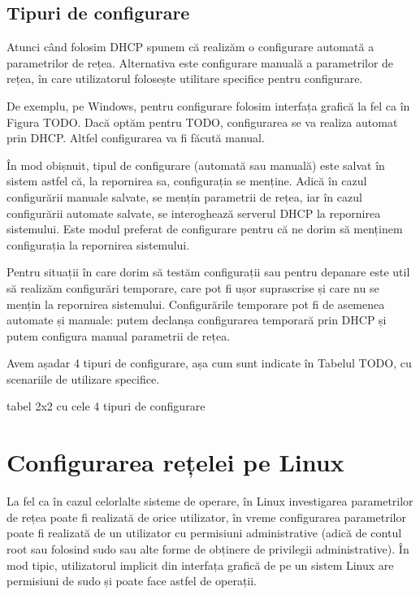 \subsection{Tipuri de configurare}
\label{sec:net:config-types}

Atunci când folosim DHCP spunem că realizăm o configurare automată a parametrilor de rețea. Alternativa este configurare manuală a parametrilor de rețea, în care utilizatorul folosește utilitare specifice pentru configurare.

De exemplu, pe Windows, pentru configurare folosim interfața grafică la fel ca în Figura TODO. Dacă optăm pentru TODO, configurarea se va realiza automat prin DHCP. Altfel configurarea va fi făcută manual.

În mod obișnuit, tipul de configurare (automată sau manuală) este salvat în sistem astfel că, la repornirea sa, configurația se menține. Adică în cazul configurării manuale salvate, se mențin parametrii de rețea, iar în cazul configurării automate salvate, se interoghează serverul DHCP la repornirea sistemului. Este modul preferat de configurare pentru că ne dorim să menținem configurația la repornirea sistemului.

Pentru situații în care dorim să testăm configurații sau pentru depanare este util să realizăm configurări temporare, care pot fi ușor suprascrise și care nu se mențin la repornirea sistemului. Configurările temporare pot fi de asemenea automate și manuale: putem declanșa configurarea temporară prin DHCP și putem configura manual parametrii de rețea.

Avem așadar 4 tipuri de configurare, așa cum sunt indicate în Tabelul TODO, cu scenariile de utilizare specifice.

tabel 2x2 cu cele 4 tipuri de configurare

\section{Configurarea rețelei pe Linux}
\label{sec:net:config-linux}

La fel ca în cazul celorlalte sisteme de operare, în Linux investigarea parametrilor de rețea poate fi realizată de orice utilizator, în vreme configurarea parametrilor poate fi realizată de un utilizator cu permisiuni administrative (adică de contul root sau folosind sudo sau alte forme de obținere de privilegii administrative). În mod tipic, utilizatorul implicit din interfața grafică de pe un sistem Linux are permisiuni de sudo și poate face astfel de operații.

